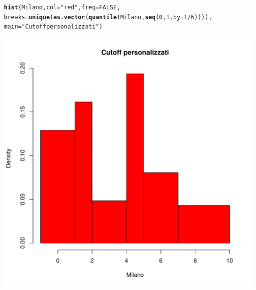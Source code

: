 \documentclass[onecolumn,12pt]{book}\usepackage[]{graphicx}\usepackage[]{color}
\makeatletter
\def\maxwidth{ %
  \ifdim\Gin@nat@width>\linewidth
    \linewidth
  \else
    \Gin@nat@width
  \fi
}
\newcommand{\hlnum}[1]{\textcolor[rgb]{0.686,0.059,0.569}{#1}}%
\newcommand{\hlstr}[1]{\textcolor[rgb]{0.192,0.494,0.8}{#1}}%
\newcommand{\hlopt}[1]{\textcolor[rgb]{0,0,0}{#1}}%
\newcommand{\hlstd}[1]{\textcolor[rgb]{0.345,0.345,0.345}{#1}}%
\newcommand{\hlkwc}[1]{\textcolor[rgb]{0.333,0.667,0.333}{#1}}%
\newcommand{\hlkwd}[1]{\textcolor[rgb]{0.737,0.353,0.396}{\textbf{#1}}}%
\newenvironment{kframe}{%
 \def\at@end@of@kframe{}%
 \ifinner\ifhmode%
  \def\at@end@of@kframe{\end{minipage}}%
  \begin{minipage}{\columnwidth}%
 \fi\fi%
 \def\FrameCommand##1{\hskip\@totalleftmargin \hskip-\fboxsep
 \colorbox{shadecolor}{##1}\hskip-\fboxsep
     \hskip-\linewidth \hskip-\@totalleftmargin \hskip\columnwidth}%
 \MakeFramed {\advance\hsize-\width
   \@totalleftmargin\z@ \linewidth\hsize
   \@setminipage}}%
 {\par\unskip\endMakeFramed%
 \at@end@of@kframe}
\newenvironment{knitrout}{}{} %
\makeatother
\begin{document}
\begin{knitrout}
\color{fgcolor}\begin{kframe}
\begin{alltt}
\hlkwd{hist}\hlstd{(Milano,}\hlkwc{col}\hlstd{=}\hlstr{"red"}\hlstd{,}\hlkwc{freq}\hlstd{=}\hlnum{FALSE}\hlstd{,}
\hlkwc{breaks}\hlstd{=}\hlkwd{unique}\hlstd{(}\hlkwd{as.vector}\hlstd{(}\hlkwd{quantile}\hlstd{(Milano,}\hlkwd{seq}\hlstd{(}\hlnum{0}\hlstd{,}\hlnum{1}\hlstd{,}\hlkwc{by}\hlstd{=}\hlnum{1}\hlopt{/}\hlnum{6}\hlstd{)))),}
\hlkwc{main}\hlstd{=}\hlstr{"Cutoff personalizzati"}\hlstd{)}
\end{alltt}
\end{kframe}
\includegraphics[width=\maxwidth]{figure/unnamed-chunk-109-1} 

\end{knitrout}
\end{document}
